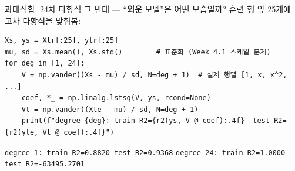 \begin{frame}[fragile]{과대적합: 24차 다항식}
  그 반대 --- ``\textbf{외운} 모델''은 어떤 모습일까? 훈련 행 앞
  25개에 고차 다항식을 맞춰봄:
  \begin{lstlisting}
Xs, ys = Xtr[:25], ytr[:25]
mu, sd = Xs.mean(), Xs.std()        # 표준화 (Week 4.1 스케일 문제)
for deg in [1, 24]:
    V = np.vander((Xs - mu) / sd, N=deg + 1)  # 설계 행렬 [1, x, x^2, ...]
    coef, *_ = np.linalg.lstsq(V, ys, rcond=None)
    Vt = np.vander((Xte - mu) / sd, N=deg + 1)
    print(f"degree {deg}: train R2={r2(ys, V @ coef):.4f}  test R2={r2(yte, Vt @ coef):.4f}")
\end{lstlisting}
  {\footnotesize \texttt{degree 1:  train R2=0.8820  test R2=0.9368}
  \qquad \texttt{degree 24: train R2=1.0000  test R2=-63495.2701}}
\end{frame}
